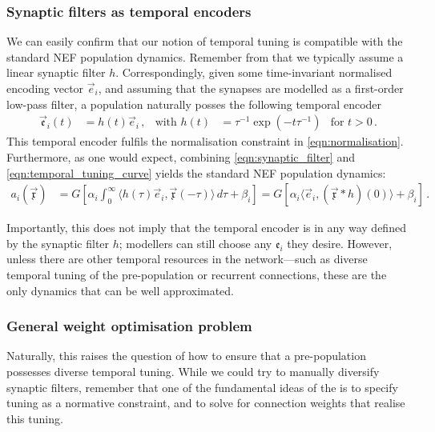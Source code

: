 \subsubsection{Synaptic filters as temporal encoders}
We can easily confirm that our notion of temporal tuning is compatible with the standard NEF population dynamics.
Remember from  that we typically assume a linear synaptic filter $h$.
Correspondingly, given some time-invariant normalised encoding vector $\vec e_i$, and assuming that the synapses are modelled as a first-order low-pass filter, a population naturally posses the following temporal encoder
\begin{align}
	\vec{\mathfrak{e}}_i(t)
		&= h(t) \vec e_i \,, & \text{with } h(t) &= \tau^{-1} \exp(-t \tau^{-1}) & \text{for } t > 0 \,.
	\label{eqn:synaptic_filter}
\end{align}
This temporal encoder fulfils the normalisation constraint in \cref{eqn:normalisation}.
Furthermore, as one would expect, combining \cref{eqn:synaptic_filter} and \cref{eqn:temporal_tuning_curve} yields the standard NEF population dynamics:
\begin{align}
	a_i(\vec{\mathfrak{x}})
		&= G\left[ \alpha_i \! \int_{0}^\infty \!\!\! \big\langle h(\tau) \vec{e}_i, \vec{\mathfrak{x}}(-\tau) \big\rangle \,\mathit{d\tau} + \beta_i \right]
		 = G\left[ \alpha_i \big\langle \vec e_i, (\vec{\mathfrak{x}} \ast h)(0) \big\rangle + \beta_i \right] \,.
	\label{eqn:synaptic_filter_tuning_curve}
\end{align}

Importantly, this does not imply that the temporal encoder is in any way defined by the synaptic filter $h$; modellers can still choose any $\mathfrak{e}_i$ they desire.
However, unless there are other temporal resources in the network---such as diverse temporal tuning of the pre-population or recurrent connections, these are the only dynamics that can be well approximated.


\subsubsection{General weight optimisation problem}
Naturally, this raises the question of how to ensure that a pre-population possesses diverse temporal tuning.
While we could try to manually diversify synaptic filters, remember that one of the fundamental ideas of the \NEF is to specify tuning as a normative constraint, and to solve for connection weights that realise this tuning.

